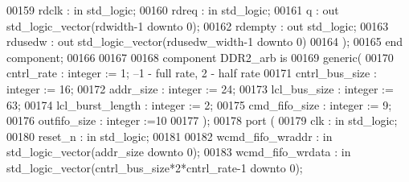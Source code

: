 \begin{DoxyCode}
00159       rdclk          : \textcolor{keywordflow}{in} \textcolor{comment}{std\_logic};
00160       rdreq         : \textcolor{keywordflow}{in} \textcolor{comment}{std\_logic};
00161       q             : \textcolor{keywordflow}{out} \textcolor{comment}{std\_logic\_vector}(rdwidth\textcolor{vhdlchar}{-}\textcolor{vhdllogic}{}\textcolor{vhdllogic}{1} \textcolor{keywordflow}{downto} \textcolor{vhdllogic}{}\textcolor{vhdllogic}{0});
00162       rdempty       : \textcolor{keywordflow}{out} \textcolor{comment}{std\_logic};
00163       rdusedw       : \textcolor{keywordflow}{out} \textcolor{comment}{std\_logic\_vector}(rdusedw_width\textcolor{vhdlchar}{-}\textcolor{vhdllogic}{}\textcolor{vhdllogic}{1} \textcolor{keywordflow}{downto} \textcolor{vhdllogic}{}\textcolor{vhdllogic}{0})     
00164         );
00165 \textcolor{keywordflow}{end} \textcolor{keywordflow}{component}; 
00166 
00167 
00168 \textcolor{keywordflow}{component} DDR2_arb \textcolor{keywordflow}{is}
00169     \textcolor{keywordflow}{generic}(
00170         cntrl_rate          : \textcolor{comment}{integer} := \textcolor{vhdllogic}{}\textcolor{vhdllogic}{1}; \textcolor{keyword}{--1 - full rate, 2 - half rate}
00171         cntrl_bus_size      : \textcolor{comment}{integer} := \textcolor{vhdllogic}{}\textcolor{vhdllogic}{16};
00172         addr_size           : \textcolor{comment}{integer} := \textcolor{vhdllogic}{}\textcolor{vhdllogic}{24};
00173         lcl_bus_size        : \textcolor{comment}{integer} := \textcolor{vhdllogic}{}\textcolor{vhdllogic}{63};
00174         lcl_burst_length    : \textcolor{comment}{integer} := \textcolor{vhdllogic}{}\textcolor{vhdllogic}{2};
00175         cmd_fifo_size       : \textcolor{comment}{integer} := \textcolor{vhdllogic}{}\textcolor{vhdllogic}{9};
00176         outfifo_size        : \textcolor{comment}{integer} :=\textcolor{vhdllogic}{}\textcolor{vhdllogic}{10}
00177         );
00178   \textcolor{keywordflow}{port} (
00179       clk                   : \textcolor{keywordflow}{in} \textcolor{comment}{std\_logic};
00180       reset_n               : \textcolor{keywordflow}{in} \textcolor{comment}{std\_logic};
00181 
00182         wcmd_fifo_wraddr    : \textcolor{keywordflow}{in} \textcolor{comment}{std\_logic\_vector}(addr_size \textcolor{keywordflow}{downto} \textcolor{vhdllogic}{}\textcolor{vhdllogic}{0});
00183         wcmd_fifo_wrdata    : \textcolor{keywordflow}{in} \textcolor{comment}{std\_logic\_vector}(cntrl_bus_size*\textcolor{vhdllogic}{}\textcolor{vhdllogic}{2}*cntrl_rate\textcolor{vhdlchar}{-}\textcolor{vhdllogic}{}\textcolor{vhdllogic}{1} \textcolor{keywordflow}{downto} \textcolor{vhdllogic}{}\textcolor{vhdllogic}{0});

\end{DoxyCode}
